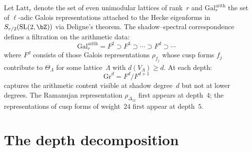 \begin{definition}
\label{def:arithmetic-depth-filtration}
Let $\mathrm{Latt}_r$ denote the set of even unimodular lattices of
rank~$r$ and $\mathrm{Gal}^{\mathrm{arith}}_r$ the set of
$\ell$-adic Galois representations attached to the Hecke eigenforms
in $S_{r/2}(\mathrm{SL}(2,\bZ))$ via Deligne's theorem.
The shadow--spectral correspondence defines a filtration on the
arithmetic data:
\begin{equation}\label{eq:arithmetic-filtration}
\mathrm{Gal}^{\mathrm{arith}}_r =
 F^2 \supset F^3 \supset \cdots \supset F^d
 \supset \cdots
\end{equation}
where $F^d$ consists of those Galois representations $\rho_{f_j}$
whose cusp forms $f_j$ contribute to $\Theta_\Lambda$ for some
lattice~$\Lambda$ with $d(V_\Lambda)\geq d$. At each depth:
\[
 \mathrm{Gr}^d = F^d / F^{d+1}
\]
captures the arithmetic content visible at shadow degree~$d$ but not
at lower degrees. The Ramanujan representation
$\rho_{\Delta_{12}}$ first appears at depth~$4$; the representations
of cusp forms of weight~$24$ first appear at depth~$5$.
\end{definition}

\section{The depth decomposition}
\label{sec:depth-decomposition-section}
\label{sec:genus-two-arithmetic-frontier}
\label{sec:spectral-continuation}

